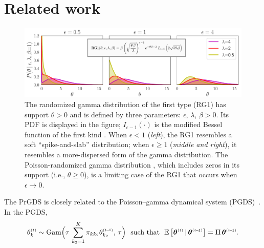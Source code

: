 \documentclass{article}
\begin{document}
\section{Related work}
\label{sec:bg}
\begin{figure}[t]
\centering
\includegraphics[width=\linewidth]{../../fig/distributions/annotated_rg1.pdf}
\caption{\footnotesize \label{fig:rg1} The randomized gamma distribution of the first type (RG1) \cite{yuan2000bessel,makarov2010exact} has support $\theta \!>\!  0$ and is defined by three parameters: $\epsilon$, $\lambda$, $\beta \!>\! 0$. Its PDF is displayed in the figure; $I_{\epsilon - 1}(\cdot)$ is the modified Bessel function of the first kind \cite{abramowitz1965handbook}. When $\epsilon < 1$ (\emph{left}), the RG1 resembles a soft ``spike-and-slab'' distribution; when $\epsilon \geq 1$ (\emph{middle and right}), it resembles a more-dispersed form of the gamma distribution. The Poisson-randomized gamma distribution \cite{zhou2016augmentable}, which includes zeros in its support (i.e., $\theta \geq 0$), is a limiting case of the RG1 that occurs when $\epsilon \!\rightarrow\! 0$.~}%
\end{figure}
The PrGDS is closely related to the Poisson--gamma dynamical system (PGDS)~\citep{schein2016poisson}. In the PGDS,~%
\begin{equation}
\label{eq:pgds}
\thetakt \sim \textrm{Gam}\Big(\tau\,\sum_{k_2=1}^K \pi_{kk_2} \thetakttm,\, \tau\Big)\,\,\textrm{ such that }\,\,
%
\mathbb{E}\left[\boldsymbol{\theta}^{\mathsmaller{(t)}} \given \boldsymbol{\theta}^{\mathsmaller{(t \tm 1)}}\right]= \Pi \, \boldsymbol{\theta}^{\mathsmaller{(t \tm 1)}}.
\end{equation}
\end{document}
